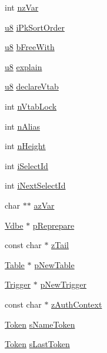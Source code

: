 \begin{DoxyCompactItemize}
\item 
int \hyperlink{struct_parse_aeb9c5f4bed2bb8dfd350896fe67e9312}{nz\+Var}
\item 
\hyperlink{sqlite3_8c_a74a0f6424ae628af25f23f0a35f6ead3}{u8} \hyperlink{struct_parse_a3813b936696feff0b9e68c70c22fc0ea}{i\+Pk\+Sort\+Order}
\item 
\hyperlink{sqlite3_8c_a74a0f6424ae628af25f23f0a35f6ead3}{u8} \hyperlink{struct_parse_a8f3eca69a1045d4da99782215c858394}{b\+Free\+With}
\item 
\hyperlink{sqlite3_8c_a74a0f6424ae628af25f23f0a35f6ead3}{u8} \hyperlink{struct_parse_a2b62234e0234e2065724146f00c574cd}{explain}
\item 
\hyperlink{sqlite3_8c_a74a0f6424ae628af25f23f0a35f6ead3}{u8} \hyperlink{struct_parse_ac0510fd1157fb5ff185aa29a41c13e80}{declare\+Vtab}
\item 
int \hyperlink{struct_parse_ac2e869640141f1ea530ea807d40a0a8f}{n\+Vtab\+Lock}
\item 
int \hyperlink{struct_parse_acec6917b7abc43bce31bbdc924c37872}{n\+Alias}
\item 
int \hyperlink{struct_parse_a17d981419afeee27eb36a8b43183e49a}{n\+Height}
\item 
int \hyperlink{struct_parse_a859d1cc55df407e1fb09827e8feed3af}{i\+Select\+Id}
\item 
int \hyperlink{struct_parse_a3be2f867adaaf8dbbd088858f4eeca69}{i\+Next\+Select\+Id}
\item 
char $\ast$$\ast$ \hyperlink{struct_parse_a61698685ffc73e64afd9ed436a5a101a}{az\+Var}
\item 
\hyperlink{struct_vdbe}{Vdbe} $\ast$ \hyperlink{struct_parse_a0eb9386bc6675b699f91ebe6ba1ee13e}{p\+Reprepare}
\item 
const char $\ast$ \hyperlink{struct_parse_a348e455e10b33438eb61659f0364d546}{z\+Tail}
\item 
\hyperlink{struct_table}{Table} $\ast$ \hyperlink{struct_parse_ae0a32c951e7d0c8ae0f96529a5dba80f}{p\+New\+Table}
\item 
\hyperlink{struct_trigger}{Trigger} $\ast$ \hyperlink{struct_parse_a5c343988d894c6f7b44b19d76cdd72d4}{p\+New\+Trigger}
\item 
const char $\ast$ \hyperlink{struct_parse_a7daea745aae6a12901c52fd4f28608dc}{z\+Auth\+Context}
\item 
\hyperlink{struct_token}{Token} \hyperlink{struct_parse_ad1e8faf5ff45a16dd39d4b93503e1186}{s\+Name\+Token}
\item 
\hyperlink{struct_token}{Token} \hyperlink{struct_parse_ad72a7eb7cdb0855411e66aac2daddee6}{s\+Last\+Token}
$$
\end{DoxyCompactItemize}

